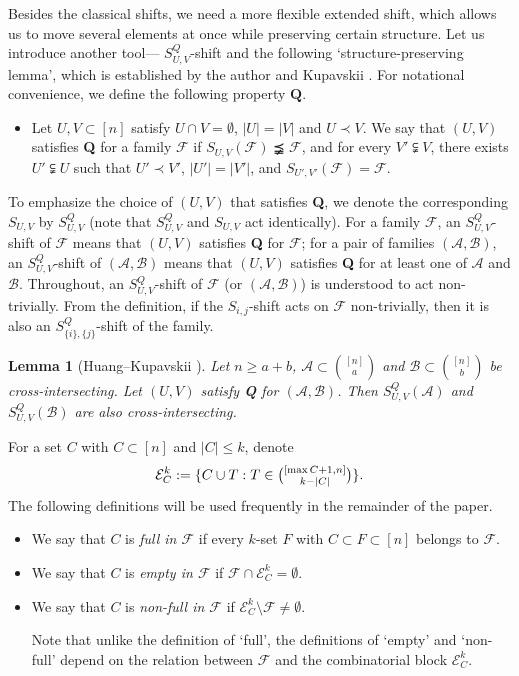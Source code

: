 \documentclass[a4paper,11pt]{article}
\newtheorem{lemma}[theorem]{Lemma}
\newcommand{\m}{\mathcal}
\begin{document}
Besides the classical shifts, we need a more flexible extended shift, which allows us to 
move several elements at once while preserving certain structure.
Let us introduce another tool--- $S_{U,V}^Q$-shift and the following `structure-preserving lemma', which is established by the author and Kupavskii \cite{HK2026}. For notational convenience, we define the following property $\bm{Q}$. 
\begin{itemize}
\item[{\bf Q}] Let $U,V\subset [n]$ satisfy 
$U\cap V=\emptyset$, $|U|=|V|$ and $U\prec V$.
We say that $(U,V)$ satisfies {\bf Q} for a family $\m F$ if $S_{U,V}(\m F)\precneqq \m F$, and 
for every $V'\subsetneqq V$, there exists $U'\subsetneqq U$ such that $U'\prec V'$, $|U'|=|V'|$, and $S_{U',V'}(\m F)=\m F$. 
\end{itemize}

To emphasize the choice of $(U,V)$ that satisfies {\bf Q}, we denote the corresponding $S_{U,V}$ by $S_{U,V}^Q$ (note that $S_{U,V}^Q$ and $S_{U,V}$ act identically).
For a family $\m F$, an $S_{U,V}^Q$-shift of $\m F$ means that $(U,V)$ satisfies {\bf Q} for $\m F$;
for a pair of families $(\mathcal A,\mathcal B)$,
an $S_{U,V}^Q$-shift of $(\mathcal A,\mathcal B)$
means that $(U,V)$ satisfies {\bf Q} 
for at least one of $\mathcal A$ and $\mathcal B$.
Throughout, an $S_{U,V}^Q$-shift of $\m F$ (or $(\mathcal A,\mathcal B)$) is understood to act non-trivially.
From the definition, if the $S_{i,j}$-shift acts on $\m F$ non-trivially, then it is also an $S_{\{i\},\{j\}}^Q$-shift of the family.

\begin{lemma}[Huang--Kupavskii \cite{HK2026}]\label{SUV'}
Let $n\ge a+b$, $\mathcal{A}\subset {[n]\choose a}$ and $\mathcal{B}\subset {[n]\choose b}$ be cross-intersecting. 
Let $(U,V)$ satisfy {\bf Q} for $(\m A, \m B)$. Then $S_{U,V}^{Q}(\mathcal{A})$ and $S_{U,V}^{Q}(\mathcal{B})$ are also cross-intersecting.
\end{lemma}



For  a set $C$ with $C\subset [n]$ and $|C|\le k$, denote
\[
\mathcal{E}^k_C:=\{C\cup T: T\in \tbinom{[\max C+1, n]}{ k-|C|}\}.
\]
The following definitions will be used frequently in the remainder of the paper.
\begin{itemize}
    \item We say that $C$ is \emph{full in $\mathcal{F}$} if every $k$-set $F$ with $C \subset F \subset [n]$ belongs to $\mathcal{F}$.
    \item We say that $C$ is \emph{empty in $\mathcal{F}$} if 
    $
    \mathcal{F} \cap \mathcal{E}^k_C = \emptyset.
    $
    \item We say that $C$ is {\it non-full in $\mathcal{F}$} if $\mathcal{E}^k_C \setminus \mathcal{F} \ne \emptyset $.

    Note that unlike the definition of `full', the definitions of `empty' and `non-full' depend on the relation between  $\mathcal{F}$ and the combinatorial block $\mathcal{E}^k_C$. 
\end{itemize}
\end{document}

